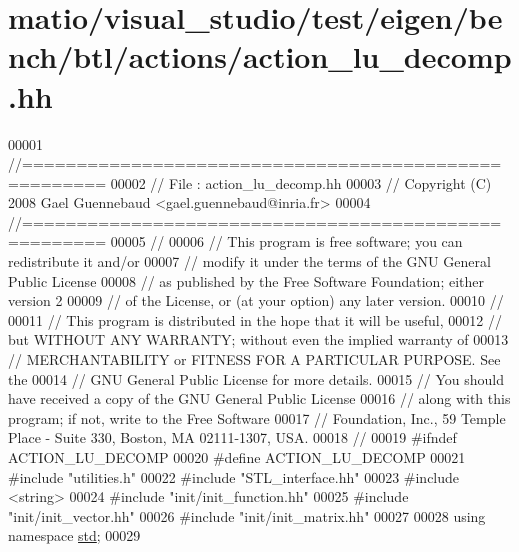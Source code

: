 \hypertarget{matio_2visual__studio_2test_2eigen_2bench_2btl_2actions_2action__lu__decomp_8hh_source}{}\section{matio/visual\+\_\+studio/test/eigen/bench/btl/actions/action\+\_\+lu\+\_\+decomp.hh}
\label{matio_2visual__studio_2test_2eigen_2bench_2btl_2actions_2action__lu__decomp_8hh_source}

\begin{DoxyCode}
00001 \textcolor{comment}{//=====================================================}
00002 \textcolor{comment}{// File   :  action\_lu\_decomp.hh}
00003 \textcolor{comment}{// Copyright (C) 2008 Gael Guennebaud <gael.guennebaud@inria.fr>}
00004 \textcolor{comment}{//=====================================================}
00005 \textcolor{comment}{//}
00006 \textcolor{comment}{// This program is free software; you can redistribute it and/or}
00007 \textcolor{comment}{// modify it under the terms of the GNU General Public License}
00008 \textcolor{comment}{// as published by the Free Software Foundation; either version 2}
00009 \textcolor{comment}{// of the License, or (at your option) any later version.}
00010 \textcolor{comment}{//}
00011 \textcolor{comment}{// This program is distributed in the hope that it will be useful,}
00012 \textcolor{comment}{// but WITHOUT ANY WARRANTY; without even the implied warranty of}
00013 \textcolor{comment}{// MERCHANTABILITY or FITNESS FOR A PARTICULAR PURPOSE.  See the}
00014 \textcolor{comment}{// GNU General Public License for more details.}
00015 \textcolor{comment}{// You should have received a copy of the GNU General Public License}
00016 \textcolor{comment}{// along with this program; if not, write to the Free Software}
00017 \textcolor{comment}{// Foundation, Inc., 59 Temple Place - Suite 330, Boston, MA  02111-1307, USA.}
00018 \textcolor{comment}{//}
00019 \textcolor{preprocessor}{#ifndef ACTION\_LU\_DECOMP}
00020 \textcolor{preprocessor}{#define ACTION\_LU\_DECOMP}
00021 \textcolor{preprocessor}{#include "utilities.h"}
00022 \textcolor{preprocessor}{#include "STL\_interface.hh"}
00023 \textcolor{preprocessor}{#include <string>}
00024 \textcolor{preprocessor}{#include "init/init\_function.hh"}
00025 \textcolor{preprocessor}{#include "init/init\_vector.hh"}
00026 \textcolor{preprocessor}{#include "init/init\_matrix.hh"}
00027 
00028 \textcolor{keyword}{using namespace }\hyperlink{namespacestd}{std};
00029 

\end{DoxyCode}
